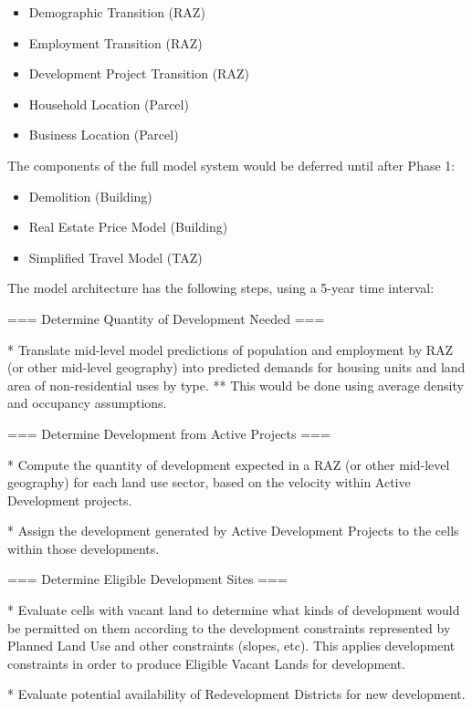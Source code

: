\begin{itemize}
\item Demographic Transition (RAZ)
\item Employment Transition (RAZ)
\item Development Project Transition (RAZ)
\item Household Location (Parcel)
\item Business Location (Parcel)
\end{itemize}

The components of the full model system would be deferred until after Phase 1:

\begin{itemize}
\item Demolition (Building)
\item Real Estate Price Model (Building)
\item Simplified Travel Model (TAZ)
\end{itemize}





The model architecture has the following steps, using a 5-year time interval:

=== Determine Quantity of Development Needed ===

* Translate mid-level model predictions of population and employment by RAZ (or other mid-level geography) into predicted demands for housing units and land area of non-residential uses by type.
** This would be done using average density and occupancy assumptions.

=== Determine Development from Active Projects ===

* Compute the quantity of development expected in a RAZ (or other mid-level geography) for each land use sector, based on the velocity within Active Development projects.

* Assign the development generated by Active Development Projects to the cells within those developments.  

=== Determine Eligible Development Sites ===

* Evaluate cells with vacant land to determine what kinds of development would be permitted on them according to the development constraints represented by Planned Land Use and other constraints (slopes, etc).  This applies development constraints in order to produce Eligible Vacant Lands for development.

* Evaluate potential availability of Redevelopment Districts for new development.

